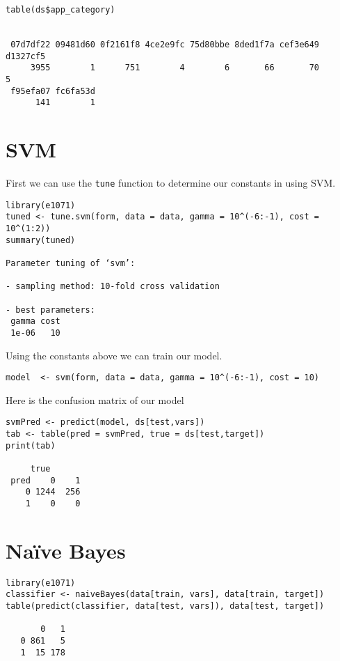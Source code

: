\documentclass[11pt,a4paper]{article}
\begin{document}
\begin{verbatim}
table(ds$app_category)


 07d7df22 09481d60 0f2161f8 4ce2e9fc 75d80bbe 8ded1f7a cef3e649 d1327cf5 
     3955        1      751        4        6       66       70        5 
 f95efa07 fc6fa53d 
      141        1
\end{verbatim}

\section{SVM}
\label{sec-2}

First we can use the \texttt{tune} function to determine our constants in using SVM.

\begin{verbatim}
library(e1071)
tuned <- tune.svm(form, data = data, gamma = 10^(-6:-1), cost = 10^(1:2))
summary(tuned)

Parameter tuning of ‘svm’:

- sampling method: 10-fold cross validation 

- best parameters:
 gamma cost
 1e-06   10
\end{verbatim}

Using the constants above we can train our model.

\begin{verbatim}
model  <- svm(form, data = data, gamma = 10^(-6:-1), cost = 10)
\end{verbatim}

Here is the confusion matrix of our model

\begin{verbatim}
svmPred <- predict(model, ds[test,vars])
tab <- table(pred = svmPred, true = ds[test,target])
print(tab)

     true
 pred    0    1
    0 1244  256
    1    0    0
\end{verbatim}

\section{Naïve Bayes}
\label{sec-3}
\begin{verbatim}
library(e1071) 
classifier <- naiveBayes(data[train, vars], data[train, target]) 
table(predict(classifier, data[test, vars]), data[test, target])

       0   1
   0 861   5
   1  15 178
\end{verbatim}
\end{document}
